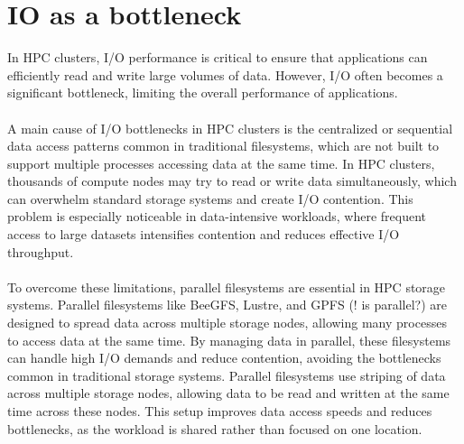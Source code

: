 \section{IO as a bottleneck}
In HPC clusters, I/O performance is critical to ensure that applications can efficiently read and write large volumes of data. However, I/O often becomes a significant bottleneck, limiting the overall performance of applications.\cite{9355272}
\\\\
A main cause of I/O bottlenecks in HPC clusters is the centralized or sequential data access patterns common in traditional filesystems, which are not built to support multiple processes accessing data at the same time. In HPC clusters, thousands of compute nodes may try to read or write data simultaneously, which can overwhelm standard storage systems and create I/O contention. This problem is especially noticeable in data-intensive workloads, where frequent access to large datasets intensifies contention and reduces effective I/O throughput.
\\\\
To overcome these limitations, parallel filesystems are essential in HPC storage systems. Parallel filesystems like BeeGFS, Lustre, and GPFS (! is parallel?) are designed to spread data across multiple storage nodes, allowing many processes to access data at the same time. By managing data in parallel, these filesystems can handle high I/O demands and reduce contention, avoiding the bottlenecks common in traditional storage systems. Parallel filesystems use striping of data across multiple storage nodes, allowing data to be read and written at the same time across these nodes. This setup improves data access speeds and reduces bottlenecks, as the workload is shared rather than focused on one location.

